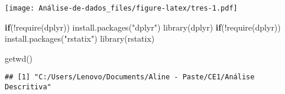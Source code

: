\documentclass[
]{article}
\newenvironment{Shaded}{\begin{snugshade}}{\end{snugshade}}
\newcommand{\AttributeTok}[1]{\textcolor[rgb]{0.77,0.63,0.00}{#1}}
\newcommand{\ControlFlowTok}[1]{\textcolor[rgb]{0.13,0.29,0.53}{\textbf{#1}}}
\newcommand{\DecValTok}[1]{\textcolor[rgb]{0.00,0.00,0.81}{#1}}
\newcommand{\FunctionTok}[1]{\textcolor[rgb]{0.00,0.00,0.00}{#1}}
\newcommand{\NormalTok}[1]{#1}
\newcommand{\OtherTok}[1]{\textcolor[rgb]{0.56,0.35,0.01}{#1}}
\newcommand{\SpecialCharTok}[1]{\textcolor[rgb]{0.00,0.00,0.00}{#1}}
\newcommand{\StringTok}[1]{\textcolor[rgb]{0.31,0.60,0.02}{#1}}
\begin{document}
\texttt{[image: Análise-de-dados\_files/figure-latex/tres-1.pdf]}

\begin{Shaded}
\begin{Highlighting}[]
\ControlFlowTok{if}\NormalTok{(}\SpecialCharTok{!}\FunctionTok{require}\NormalTok{(dplyr)) }\FunctionTok{install.packages}\NormalTok{(}\StringTok{"dplyr"}\NormalTok{) }
\FunctionTok{library}\NormalTok{(dplyr)                                }
\ControlFlowTok{if}\NormalTok{(}\SpecialCharTok{!}\FunctionTok{require}\NormalTok{(dplyr)) }\FunctionTok{install.packages}\NormalTok{(}\StringTok{"rstatix"}\NormalTok{) }
\FunctionTok{library}\NormalTok{(rstatix)}


\FunctionTok{getwd}\NormalTok{() }
\end{Highlighting}
\end{Shaded}

\begin{verbatim}
## [1] "C:/Users/Lenovo/Documents/Aline - Paste/CE1/Análise Descritiva"
\end{verbatim}

\begin{Shaded}
\end{Shaded}
\end{document}
